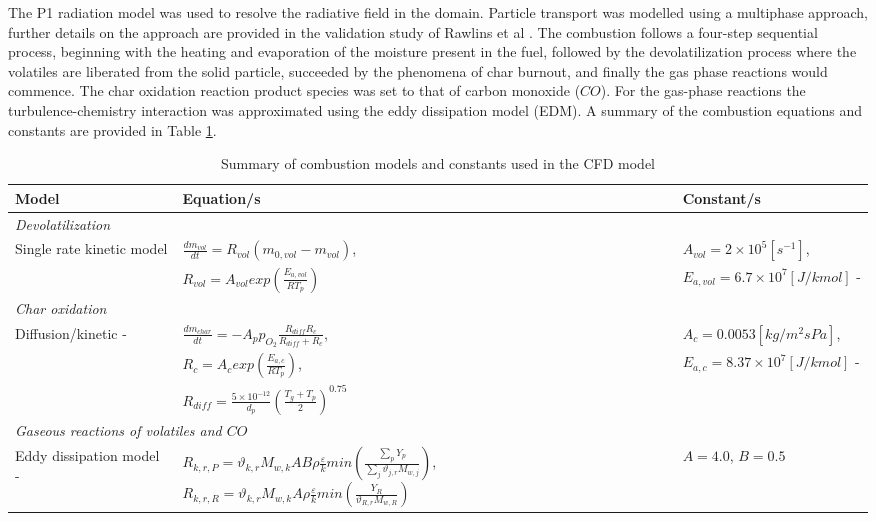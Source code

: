 \documentclass[a4paper,fleqn]{cas-dc}
\begin{document}
The P1 radiation model was used to resolve the radiative field in the domain. Particle transport was modelled using a multiphase approach, further details on the approach are provided in the validation study of Rawlins et al \citep{Rawlins2021}. The combustion follows a four-step sequential process, beginning with the heating and evaporation of the moisture present in the fuel, followed by the devolatilization process where the volatiles are liberated from the solid particle, succeeded by the phenomena of char burnout, and finally the gas phase reactions would commence. The char oxidation reaction product species was set to that of carbon monoxide ($CO$). For the gas-phase reactions the turbulence-chemistry interaction was approximated using the eddy dissipation model (EDM). A summary of the combustion equations and constants are provided in Table \ref{tbl_combust}.\\

\begin{table}[h!]
\caption{Summary of combustion models and constants used in the CFD model}\label{tbl_combust}
\begin{tabular*}{\tblwidth}{p{}p{}p{}}
\toprule
Model & Equation/s & Constant/s\\
\midrule
\multicolumn{3}{l}{\textit{Devolatilization}} \\ %
Single rate kinetic model &$\frac{dm_{vol}}{dt} = R_{vol}(m_{0,vol}-m_{vol})$,  & $A_{vol} = 2\times10^5 [s^{-1}]$, \\
& $R_{vol} = A_{vol}exp\left(\frac{E_{a,vol}}{RT_p}\right)$ & $ E_{a,vol} = 6.7\times10^7 [J/kmol]$ - \cite{Sheng2004} \\
\multicolumn{3}{l}{\textit{Char oxidation}} \\
Diffusion/kinetic - \citep{Baum1971} & $\frac{dm_{char}}{dt} = -A_p p_{O_{2}} \frac{R_{diff}R_c}{R_{diff} + R_c}$,  & $A_{c} = 0.0053 [kg/m^2sPa]$, \\
& $R_{c} = A_{c}exp\left(\frac{E_{a,c}}{RT_p}\right)$,  & $E_{a,c} = 8.37\times10^7 [J/kmol]$ - \cite{Sheng2004} \\
& $R_{diff} = \frac{5\times10^{-12}}{d_p} \left(\frac{T_g+T_p}{2}\right)^{0.75}$&\\
\multicolumn{3}{l}{\textit{Gaseous reactions of volatiles and $CO$}} \\
Eddy dissipation model - \cite{Ansys} & $R_{k,r,P} =\vartheta_{k,r}M_{w,k}AB\rho\frac{\varepsilon}{k}min\left(\frac{\sum_{p} Y_p}{\sum_{j}\vartheta_{j,r}M_{w,j}}\right)$, $R_{k,r,R} =\vartheta_{k,r}M_{w,k}A\rho\frac{\varepsilon}{k}min\left(\frac{Y_R}{\vartheta_{R,r}M_{w,R}}\right)$ & $A=4.0$, $B=0.5$\\
\bottomrule
\end{tabular*}
\end{table}
\end{document}
